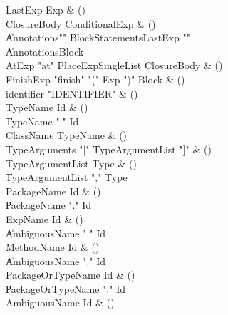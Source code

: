 \begin{bbgrammar}

 LastExp  \label{prod:LastExp}  \: Exp & ()\\
 ClosureBody  \label{prod:ClosureBody}  \: ConditionalExp & ()\\
    \| Annotations\opt \xcd"{" BlockStatements\opt LastExp \xcd"}"\\
    \| Annotations\opt Block\\
 AtExp  \label{prod:AtExp}  \: \xcd"at" PlaceExpSingleList ClosureBody & ()\\
 FinishExp  \label{prod:FinishExp}  \: \xcd"finish" \xcd"(" Exp \xcd")" Block & ()\\
 identifier  \label{prod:identifier}  \: \xcd"IDENTIFIER"  & ()\\
 TypeName  \label{prod:TypeName}  \: Id & ()\\
    \| TypeName \xcd"." Id\\
 ClassName  \label{prod:ClassName}  \: TypeName & ()\\
 TypeArguments  \label{prod:TypeArguments}  \: \xcd"[" TypeArgumentList \xcd"]" & ()\\
 TypeArgumentList  \label{prod:TypeArgumentList}  \: Type & ()\\
    \| TypeArgumentList \xcd"," Type\\
 PackageName  \label{prod:PackageName}  \: Id & ()\\
    \| PackageName \xcd"." Id\\
 ExpName  \label{prod:ExpName}  \: Id & ()\\
    \| AmbiguousName \xcd"." Id\\
 MethodName  \label{prod:MethodName}  \: Id & ()\\
    \| AmbiguousName \xcd"." Id\\
 PackageOrTypeName  \label{prod:PackageOrTypeName}  \: Id & ()\\
    \| PackageOrTypeName \xcd"." Id\\
 AmbiguousName  \label{prod:AmbiguousName}  \: Id & ()\\

\end{bbgrammar}
